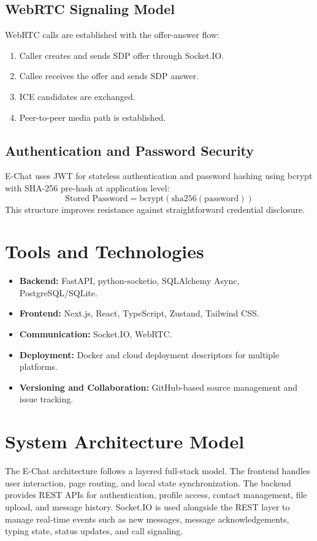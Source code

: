 \documentclass[12pt,a4paper,oneside]{report}
\begin{document}
\subsection{WebRTC Signaling Model}
\label{subsec:webrtc-signaling}
WebRTC calls are established with the offer-answer flow:
\begin{enumerate}
  \item Caller creates and sends SDP offer through Socket.IO.
  \item Callee receives the offer and sends SDP answer.
  \item ICE candidates are exchanged.
  \item Peer-to-peer media path is established.
\end{enumerate}

\subsection{Authentication and Password Security}
\label{subsec:password-security}
E-Chat uses JWT for stateless authentication and password hashing using bcrypt
with SHA-256 pre-hash at application level:
\[
\text{Stored Password} = \text{bcrypt}(\text{sha256}(\text{password}))
\]
This structure improves resistance against straightforward credential disclosure.

\section{Tools and Technologies}
\label{sec:tools-technologies}

\begin{itemize}
  \item \textbf{Backend:} FastAPI, python-socketio, SQLAlchemy Async, PostgreSQL/SQLite.
  \item \textbf{Frontend:} Next.js, React, TypeScript, Zustand, Tailwind CSS.
  \item \textbf{Communication:} Socket.IO, WebRTC.
  \item \textbf{Deployment:} Docker and cloud deployment descriptors for multiple platforms.
  \item \textbf{Versioning and Collaboration:} GitHub-based source management and issue tracking.
\end{itemize}

\section{System Architecture Model}
\label{sec:system-architecture-model}
The E-Chat architecture follows a layered full-stack model. The frontend handles
user interaction, page routing, and local state synchronization. The backend
provides REST APIs for authentication, profile access, contact management, file
upload, and message history. Socket.IO is used alongside the REST layer to manage
real-time events such as new messages, message acknowledgements, typing state,
status updates, and call signaling.
\end{document}
